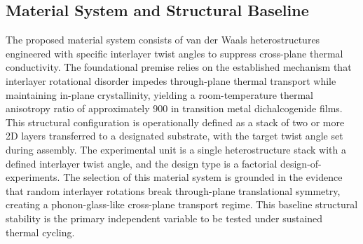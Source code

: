 \documentclass[conference]{IEEEtran}
\begin{document}
\subsection{Material System and Structural Baseline}
The proposed material system consists of van der Waals heterostructures engineered with specific interlayer twist angles to suppress cross-plane thermal conductivity. The foundational premise relies on the established mechanism that interlayer rotational disorder impedes through-plane thermal transport while maintaining in-plane crystallinity, yielding a room-temperature thermal anisotropy ratio of approximately 900 in transition metal dichalcogenide films. This structural configuration is operationally defined as a stack of two or more 2D layers transferred to a designated substrate, with the target twist angle set during assembly. The experimental unit is a single heterostructure stack with a defined interlayer twist angle, and the design type is a factorial design-of-experiments. The selection of this material system is grounded in the evidence that random interlayer rotations break through-plane translational symmetry, creating a phonon-glass-like cross-plane transport regime. This baseline structural stability is the primary independent variable to be tested under sustained thermal cycling.~\cite{cite_26ecaf73d88dfe33}
\end{document}
